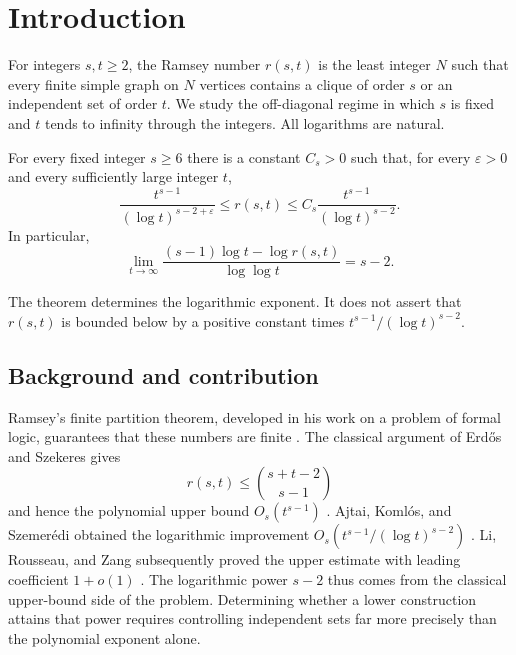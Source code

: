 \section{Introduction}
\label{intro:section}

For integers $s,t\ge2$, the Ramsey number $r(s,t)$ is the least integer
$N$ such that every finite simple graph on $N$ vertices contains a clique
of order $s$ or an independent set of order $t$. We study the
off-diagonal regime in which $s$ is fixed and $t$ tends to infinity
through the integers. All logarithms are natural.

\begin{theorem}\label{intro:main}
For every fixed integer $s\ge6$ there is a constant $C_s>0$ such that,
for every $\varepsilon>0$ and every sufficiently large integer $t$,
\[
 \frac{t^{s-1}}{(\log t)^{s-2+\varepsilon}}
 \le r(s,t)
 \le C_s\frac{t^{s-1}}{(\log t)^{s-2}}.
\]
In particular,
\[
 \lim_{t\to\infty}
 \frac{(s-1)\log t-\log r(s,t)}{\log\log t}=s-2.
\]
\end{theorem}

The theorem determines the logarithmic exponent. It does not assert
that $r(s,t)$ is bounded below by a positive constant times
$t^{s-1}/(\log t)^{s-2}$.

\subsection{Background and contribution}

Ramsey's finite partition theorem, developed in his work on a problem
of formal logic, guarantees that these numbers are finite
\cite[Theorem~B]{Ramsey1930}.
The classical argument of Erd\H{o}s and Szekeres gives
\[
 r(s,t)\le\binom{s+t-2}{s-1}
\]
and hence the polynomial upper bound $O_s(t^{s-1})$
\cite{ErdosSzekeres1935}. Ajtai, Koml\'os, and Szemer\'edi obtained the
logarithmic improvement
$O_s(t^{s-1}/(\log t)^{s-2})$ \cite{AKS1980}.
Li, Rousseau, and Zang subsequently proved the upper estimate with
leading coefficient $1+o(1)$ \cite{LiRousseauZang2001}.
The logarithmic power $s-2$ thus comes from the classical upper-bound
side of the problem. Determining whether a lower construction attains
that power requires controlling independent sets far more precisely
than the polynomial exponent alone.

